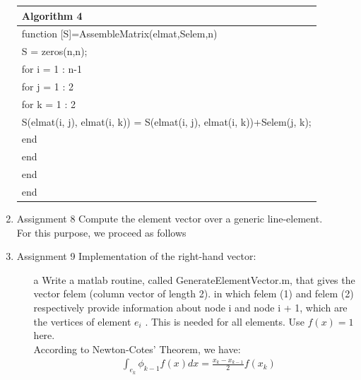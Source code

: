 \documentclass[a4paper,10pt]{report}
\begin{document}
\begin{enumerate}
\begin{table}
\begin{tabular}{ |l| } 
\hline
\textbf{Algorithm 4}\\
\hline
\hspace{0.5cm}function [S]=AssembleMatrix(elmat,Selem,n)\\
\hspace{0.5cm}S = zeros(n,n);\\
\hspace{0.5cm}for i = 1 : n-1\\
\hspace{1cm}    for j = 1 : 2\\
\hspace{1.5cm}    for k = 1 : 2\\
 \hspace{2cm}           S(elmat(i, j), elmat(i, k)) = S(elmat(i, j), elmat(i, k))+Selem(j, k);\\
 \hspace{1.5cm}       end\\
\hspace{1cm}end\\
\hspace{0.5cm}end\\
\hspace{0.5cm}end\\
\hline
\end{tabular}
\end{table}

\item{Assignment 8} Compute the element vector over a generic line-element.\\
For this purpose, we proceed as follows

\item{Assignment 9} Implementation of the right-hand vector:\\
\begin{itemize}
 \item[a] Write a matlab routine, called GenerateElementVector.m, that gives
the vector felem (column vector of length 2). in which felem (1) and
felem (2) respectively provide information about node i and node i + 1,
which are the vertices of element $e_i$ . This is needed for all elements.
Use $f (x) = 1$ here.\\
According to Newton-Cotes' Theorem, we have:
\begin{align*}
     &\int_{e_k}\phi_{k-1} f(x)dx =\frac{x_k-x_{k-1}}{2}f(x_k)
\end{align*}


\end{itemize}
\end{enumerate}
\end{document}
